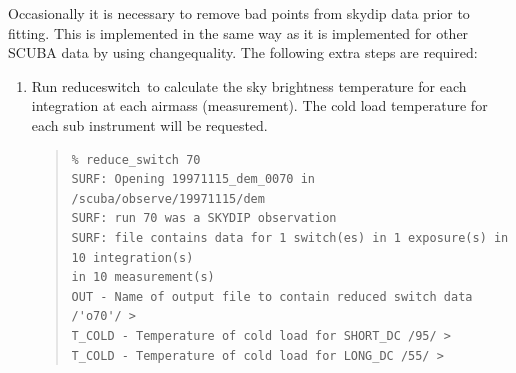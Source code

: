\documentclass[twoside,11pt]{article}
\newcommand{\task}[1]{{\sf #1}}
\newcommand{\chgqual}{\htmlref{\task{change\_quality}}{CHANGE_QUALITY}}
\newcommand{\resw}{\htmlref{\task{reduce\_switch}}{REDUCE_SWITCH}}
\newenvironment{myquote}{\begin{quote}\begin{small}}{\end{small}\end{quote}}
\newcommand{\htmlref}[2]{#1}
\renewcommand{\_}{\texttt{\symbol{95}}}
\begin{document}
Occasionally it is necessary to remove bad points from skydip data prior to
fitting. This is implemented in the same way as it is implemented for 
other SCUBA data by using \chgqual. The following extra steps are required:

\begin{enumerate}

\item Run \resw\ to calculate the sky brightness temperature for each
integration at each airmass (measurement). The cold load temperature for each
sub instrument will be requested.
\begin{myquote}
\begin{verbatim}
% reduce_switch 70
SURF: Opening 19971115_dem_0070 in /scuba/observe/19971115/dem
SURF: run 70 was a SKYDIP observation
SURF: file contains data for 1 switch(es) in 1 exposure(s) in 10 integration(s)
in 10 measurement(s)
OUT - Name of output file to contain reduced switch data /'o70'/ > 
T_COLD - Temperature of cold load for SHORT_DC /95/ > 
T_COLD - Temperature of cold load for LONG_DC /55/ > 
\end{verbatim}
\end{myquote}



\end{enumerate}
\end{document}
